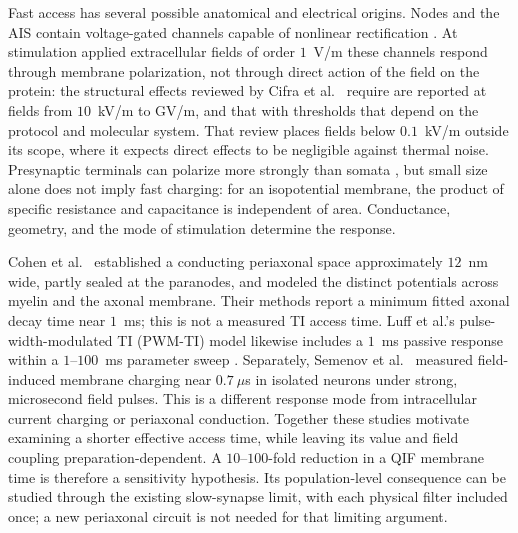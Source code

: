 \documentclass[11pt,a4paper]{article}
\providecommand{\DIFaddtex}[1]{{\protect\color{blue} \sf #1}} %
\providecommand{\DIFdeltex}[1]{{\protect\color{red} \scriptsize #1}} %
\providecommand{\DIFaddbegin}{} %
\providecommand{\DIFaddend}{} %
\providecommand{\DIFdelbegin}{} %
\providecommand{\DIFdelend}{} %
\providecommand{\DIFadd}[1]{\texorpdfstring{\DIFaddtex{#1}}{#1}} %
\providecommand{\DIFdel}[1]{\texorpdfstring{\DIFdeltex{#1}}{}} %
\begin{document}
Fast access has several possible anatomical and electrical origins. Nodes and the
AIS contain voltage-gated channels capable of nonlinear rectification
\cite{mirzakhalili2020,wang2023}. At \DIFdelbegin \DIFdel{stimulation }\DIFdelend \DIFaddbegin \DIFadd{applied extracellular }\DIFaddend fields of order $1$~V/m these
channels respond through membrane polarization, not through direct action of the
field on the protein: the structural effects reviewed by Cifra et al.\
\cite{cifra2026} \DIFdelbegin \DIFdel{require }\DIFdelend \DIFaddbegin \DIFadd{are reported at }\DIFaddend fields from $10$~kV/m to GV/m, \DIFdelbegin \DIFdel{and that }\DIFdelend \DIFaddbegin \DIFadd{with thresholds
that depend on the protocol and molecular system. That }\DIFaddend review places
fields below $0.1$~kV/m outside its scope, where it expects direct effects to be
negligible against thermal noise. Presynaptic terminals can polarize more strongly
than somata \cite{rahman2013,aberra2023,chakraborty2018}, but small size alone does
not imply fast charging: for an isopotential membrane, the product of specific
resistance and capacitance is independent of area. Conductance, geometry, and the
mode of stimulation determine the response.

Cohen et al.\ \cite{cohen2020periaxonal} established a conducting periaxonal space
approximately $12$~nm wide, partly sealed at the paranodes, and modeled the distinct
potentials across myelin and the axonal membrane. Their methods report a minimum
fitted axonal decay time near $1$~ms; this is not a measured TI access time.
Luff et al.'s pulse-width-modulated TI (PWM-TI) model likewise includes a $1$~ms passive response within a
$1$--$100$~ms parameter sweep \cite{luff2024}. Separately, Semenov et al.\
\cite{semenov2025} measured field-induced membrane charging near $0.7~\mu$s in
isolated neurons under strong, microsecond field pulses. This is a different
response mode from intracellular current charging or periaxonal conduction.
Together these studies motivate examining a shorter effective access time, while
leaving its value and field coupling preparation-dependent. A $10$--$100$-fold
reduction in a QIF membrane time is therefore a sensitivity hypothesis. Its
population-level consequence can be studied through the existing slow-synapse
limit, with each physical filter included once; a new periaxonal circuit is not
needed for that limiting argument.
\end{document}
